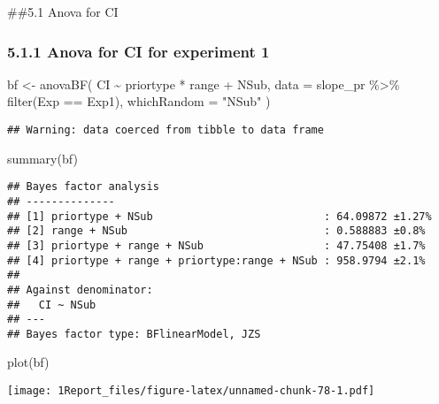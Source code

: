 \documentclass[
]{article}
\newenvironment{Shaded}{\begin{snugshade}}{\end{snugshade}}
\newcommand{\AttributeTok}[1]{\textcolor[rgb]{0.77,0.63,0.00}{#1}}
\newcommand{\FunctionTok}[1]{\textcolor[rgb]{0.00,0.00,0.00}{#1}}
\newcommand{\NormalTok}[1]{#1}
\newcommand{\OtherTok}[1]{\textcolor[rgb]{0.56,0.35,0.01}{#1}}
\newcommand{\SpecialCharTok}[1]{\textcolor[rgb]{0.00,0.00,0.00}{#1}}
\newcommand{\StringTok}[1]{\textcolor[rgb]{0.31,0.60,0.02}{#1}}
\begin{document}
\#\#5.1 Anova for CI

\hypertarget{anova-for-ci-for-experiment-1}{%
\subsubsection{5.1.1 Anova for CI for experiment
1}\label{anova-for-ci-for-experiment-1}}

\begin{Shaded}
\begin{Highlighting}[]
\NormalTok{bf }\OtherTok{\textless{}{-}} \FunctionTok{anovaBF}\NormalTok{( CI }\SpecialCharTok{\textasciitilde{}}\NormalTok{ priortype }\SpecialCharTok{*}\NormalTok{ range }\SpecialCharTok{+}\NormalTok{ NSub, }\AttributeTok{data =}\NormalTok{  slope\_pr }\SpecialCharTok{\%\textgreater{}\%} \FunctionTok{filter}\NormalTok{(Exp }\SpecialCharTok{==} \StringTok{\textquotesingle{}Exp1\textquotesingle{}}\NormalTok{), }\AttributeTok{whichRandom =} \StringTok{"NSub"}\NormalTok{ ) }
\end{Highlighting}
\end{Shaded}

\begin{verbatim}
## Warning: data coerced from tibble to data frame
\end{verbatim}

\begin{Shaded}
\begin{Highlighting}[]
\FunctionTok{summary}\NormalTok{(bf)}
\end{Highlighting}
\end{Shaded}

\begin{verbatim}
## Bayes factor analysis
## --------------
## [1] priortype + NSub                           : 64.09872 ±1.27%
## [2] range + NSub                               : 0.588883 ±0.8%
## [3] priortype + range + NSub                   : 47.75408 ±1.7%
## [4] priortype + range + priortype:range + NSub : 958.9794 ±2.1%
## 
## Against denominator:
##   CI ~ NSub 
## ---
## Bayes factor type: BFlinearModel, JZS
\end{verbatim}

\begin{Shaded}
\begin{Highlighting}[]
\FunctionTok{plot}\NormalTok{(bf)}
\end{Highlighting}
\end{Shaded}

\texttt{[image: 1Report\_files/figure-latex/unnamed-chunk-78-1.pdf]}
\end{document}
